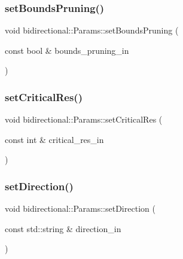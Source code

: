 \subsubsection{\texorpdfstring{set\+Bounds\+Pruning()}{setBoundsPruning()}}
{\footnotesize\ttfamily void bidirectional\+::\+Params\+::set\+Bounds\+Pruning (\begin{DoxyParamCaption}\item[{const bool \&}]{bounds\+\_\+pruning\+\_\+in }\end{DoxyParamCaption})\hspace{0.3cm}{\ttfamily [inline]}}

\mbox{\label{classbidirectional_1_1Params_a4cb80c6a553af542ee696b63f031d547}} 
\subsubsection{\texorpdfstring{set\+Critical\+Res()}{setCriticalRes()}}
{\footnotesize\ttfamily void bidirectional\+::\+Params\+::set\+Critical\+Res (\begin{DoxyParamCaption}\item[{const int \&}]{critical\+\_\+res\+\_\+in }\end{DoxyParamCaption})\hspace{0.3cm}{\ttfamily [inline]}}

\mbox{\label{classbidirectional_1_1Params_a8cd76d63403256defcfff896d33a4fc6}} 
\subsubsection{\texorpdfstring{set\+Direction()}{setDirection()}}
{\footnotesize\ttfamily void bidirectional\+::\+Params\+::set\+Direction (\begin{DoxyParamCaption}\item[{const std\+::string \&}]{direction\+\_\+in }\end{DoxyParamCaption})\hspace{0.3cm}{\ttfamily [inline]}}

